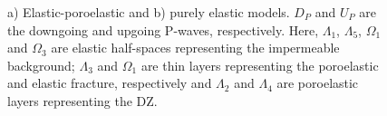 \documentclass[draft]{agujournal2019}
\begin{document}
 \begin{figure}[!ht]
\centering
{}
        
\caption{ a) Elastic-poroelastic  and b) purely elastic models. $D_P$ and $U_P$ are the downgoing and upgoing P-waves, respectively. Here, $\Lambda_1$, $\Lambda_5$, $\Omega_1$ and $\Omega_3$ are elastic half-spaces representing the impermeable background; $\Lambda_3$ and $\Omega_1$ are thin layers representing the  poroelastic and elastic fracture, respectively and $\Lambda_2$ and $\Lambda_4$ are poroelastic layers representing the DZ.}
\label{fig:1}
\end{figure}
\end{document}
